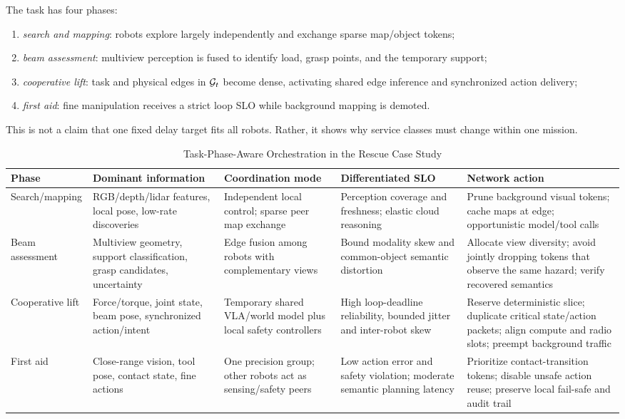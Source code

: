 \documentclass[letterpaper,journal]{IEEEtran}
\begin{document}
The task has four phases:
\begin{enumerate}
\item \emph{search and mapping}: robots explore largely independently and
exchange sparse map/object tokens;
\item \emph{beam assessment}: multiview perception is fused to identify load,
grasp points, and the temporary support;
\item \emph{cooperative lift}: task and physical edges in
${\cal G}_t$ become dense, activating shared edge inference and synchronized
action delivery;
\item \emph{first aid}: fine manipulation receives a strict loop SLO while
background mapping is demoted.
\end{enumerate}
This is not a claim that one fixed delay target fits all robots. Rather, it
shows why service classes must change within one mission.

\begin{table}[t]
\caption{Task-Phase-Aware Orchestration in the Rescue Case Study}
\label{tab:case}
\centering
\footnotesize
\renewcommand{\arraystretch}{1.2}
\setlength{\tabcolsep}{3.1pt}
\begin{tabular}{|p{}|p{}|p{}|p{}|p{}|}
\hline
\textbf{Phase} & \textbf{Dominant information} & \textbf{Coordination mode}
& \textbf{Differentiated SLO} & \textbf{Network action} \\ \hline
Search/mapping &
RGB/depth/lidar features, local pose, low-rate discoveries &
Independent local control; sparse peer map exchange &
Perception coverage and freshness; elastic cloud reasoning &
Prune background visual tokens; cache maps at edge; opportunistic model/tool
calls \\ \hline
Beam assessment &
Multiview geometry, support classification, grasp candidates, uncertainty &
Edge fusion among robots with complementary views &
Bound modality skew and common-object semantic distortion &
Allocate view diversity; avoid jointly dropping tokens that observe the same
hazard; verify recovered semantics \\ \hline
Cooperative lift &
Force/torque, joint state, beam pose, synchronized action/intent &
Temporary shared VLA/world model plus local safety controllers &
High loop-deadline reliability, bounded jitter and inter-robot skew &
Reserve deterministic slice; duplicate critical state/action packets; align
compute and radio slots; preempt background traffic \\ \hline
First aid &
Close-range vision, tool pose, contact state, fine actions &
One precision group; other robots act as sensing/safety peers &
Low action error and safety violation; moderate semantic planning latency &
Prioritize contact-transition tokens; disable unsafe action reuse; preserve
local fail-safe and audit trail \\ \hline
\end{tabular}
\end{table}
\end{document}
